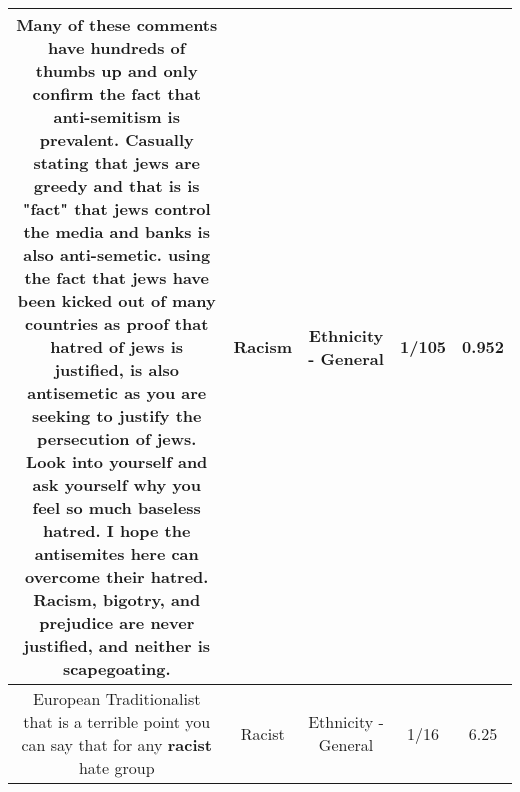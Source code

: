 \documentclass[11pt]{article}
\newlength\mylength
\begin{document}
\begin{center}
\begin{longtable}{|C{.65\mylength}|C{.30\mylength}|C{.12\mylength}|C{.12\mylength}|C{.12\mylength}|}
  \small Many of these comments have hundreds of thumbs up and only confirm the fact that anti-semitism is prevalent. Casually stating that jews are greedy and that is is "fact" that jews control the media and banks is also anti-semetic. using the fact that jews have been kicked out of many countries as proof that hatred of jews is justified, is also antisemetic as you are seeking to justify the persecution of jews. Look into yourself and ask yourself why you feel so much baseless hatred. I hope the antisemites here can overcome their hatred. \textbf{Racism}, bigotry, and prejudice are never justified, and neither is scapegoating.\normalsize   & Racism & Ethnicity - General & 1/105 & 0.952 \\  \hline
  \small European Traditionalist that is a terrible point you can say that for any \textbf{racist} hate group\normalsize   & Racist & Ethnicity - General & 1/16 & 6.25 \\  \hline

\end{longtable}
\end{center}
\end{document}
